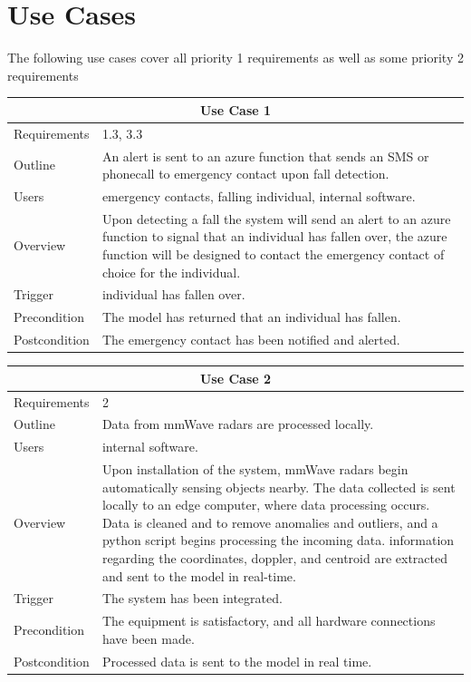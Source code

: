 \section{Use Cases}
The following use cases cover all priority 1 requirements as well as some priority 2 requirements
\begin{table}[H]
    \centering
    \begin{tabular}{ |p{2.8cm}|p{8cm}|}
     \hline
     \multicolumn{2}{|c|}{Use Case 1} \\
     \hline
      Requirements&1.3, 3.3\\
     \hline
     Outline &An alert is sent to an azure function that sends an SMS or phonecall to emergency contact upon fall detection.\\
     \hline
     Users&emergency contacts, falling individual, internal software.\\
     \hline
     Overview&Upon detecting a fall the system will send an alert to an azure function to signal that an individual has fallen over, the azure function will be designed to contact the emergency contact of choice for the individual.\\
     \hline
     Trigger&individual has fallen over.\\
     \hline
     Precondition&The model has returned that an individual has fallen.\\
     \hline
     Postcondition&The emergency contact has been notified and alerted.\\
     \hline
    \end{tabular}
\end{table}

\begin{table}[H]
    \centering
    \begin{tabular}{ |p{2.8cm}|p{8cm}|}
     \hline
     \multicolumn{2}{|c|}{Use Case 2} \\
     \hline
      Requirements&2\\
     \hline
     Outline &Data from mmWave radars are processed locally.\\
     \hline
     Users&internal software.\\
     \hline
     Overview&Upon installation of the system, mmWave radars begin automatically sensing objects nearby. The data collected is sent locally to an edge computer, where data processing occurs. Data is cleaned and to remove anomalies and outliers, and a python script begins processing the incoming data. information regarding the coordinates, doppler, and centroid are extracted and sent to the model in real-time.\\
     \hline
     Trigger&The system has been integrated.\\
     \hline
     Precondition&The equipment is satisfactory, and all hardware connections have been made.\\
     \hline
     Postcondition&Processed data is sent to the model in real time.\\
     \hline
    \end{tabular}
\end{table}

